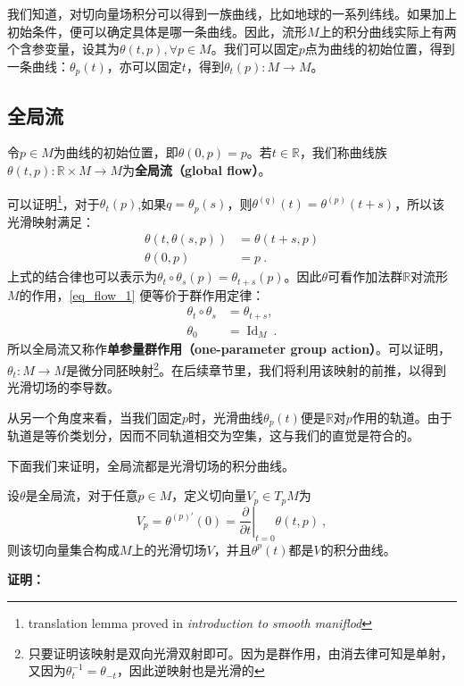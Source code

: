 我们知道，对切向量场积分可以得到一族曲线，比如地球的一系列纬线。如果加上初始条件，便可以确定具体是哪一条曲线。因此，流形$M$上的积分曲线实际上有两个含参变量，设其为$\theta(t,p),\forall p\in M$。我们可以固定$p$点为曲线的初始位置，得到一条曲线：$\theta_p(t)$，亦可以固定$t$，得到$\theta_t(p):M\rightarrow M$。
\subsection{全局流}
令$p\in M$为曲线的初始位置，即$\theta(0,p)=p$。若$t\in\mathbb R$，我们称曲线族$\theta(t,p):\mathbb R\times M\rightarrow M$为\textbf{全局流（global flow）}。

可以证明\footnote{translation lemma proved in \textsl{introduction to smooth maniflod}}，对于$\theta_t(p)$,如果$q=\theta_p(s)$，则$\theta^{(q)}(t)=\theta^{(p)}(t+s)$，所以该光滑映射满足：
\begin{equation}\label{eq_flow_1}
\begin{aligned}
\theta(t, \theta(s, p)) & =\theta(t+s, p) \\
\theta(0, p) & =p~.
\end{aligned}
\end{equation}
上式的结合律也可以表示为$\theta_t \circ \theta_s(p)=\theta_{t+s}(p)$。因此$\theta$可看作加法群$\mathbb R$对流形$M$的作用，\autoref{eq_flow_1} 便等价于群作用定律：
\begin{equation}
\begin{aligned}
\theta_t \circ \theta_s & =\theta_{t+s}, \\
\theta_0 & =\operatorname{Id}_M~.
\end{aligned}
\end{equation}
所以全局流又称作\textbf{单参量群作用（one-parameter group action）}。可以证明，$\theta_t:M\rightarrow M$是微分同胚映射\footnote{只要证明该映射是双向光滑双射即可。因为是群作用，由消去律可知是单射，又因为$\theta^{-1}_t=\theta_{-t}$，因此逆映射也是光滑的}。在后续章节里，我们将利用该映射的前推，以得到光滑切场的李导数。


从另一个角度来看，当我们固定$p$时，光滑曲线$\theta_p(t)$便是$\mathbb R$对$p$作用的轨道。由于轨道是等价类划分，因而不同轨道相交为空集，这与我们的直觉是符合的。

下面我们来证明，全局流都是光滑切场的积分曲线。
\begin{theorem}{}
设$\theta$是全局流，对于任意$p\in M$，定义切向量$V_p\in T_p M$为
\begin{equation}
V_p=\theta^{(p) \prime}(0)=\left.\frac{\partial}{\partial t}\right|_{t=0} \theta(t, p) ~,
\end{equation}
则该切向量集合构成$M$上的光滑切场$V$，并且$\theta^p(t)$都是$V$的积分曲线。
\end{theorem}
\textbf{证明：}

